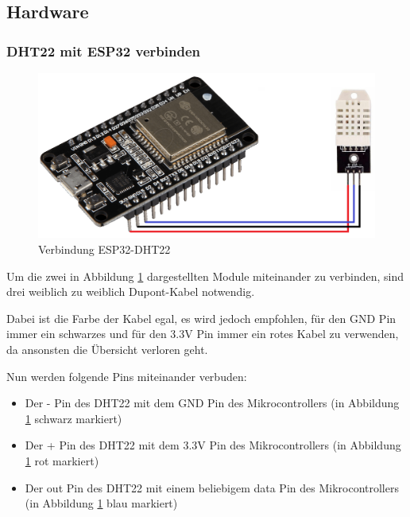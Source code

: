 \subsection{Hardware}

\subsubsection{DHT22 mit ESP32 verbinden}
\begin{figure}[H]
    \begin{center}
        \includegraphics[scale=0.36]{images/DHT22-ESP32-Connection.png}
        \caption{Verbindung ESP32-DHT22 \cite{dht22_picture, nodemcu_picture_joy-it}}
        \label{abb:esp32-dht22}
    \end{center}
\end{figure}

Um die zwei in Abbildung \ref{abb:esp32-dht22} dargestellten Module miteinander zu verbinden, sind drei weiblich zu weiblich Dupont-Kabel notwendig.

Dabei ist die Farbe der Kabel egal, es wird jedoch empfohlen, für den GND Pin immer ein schwarzes und für den 3.3V Pin immer ein rotes Kabel zu verwenden, da ansonsten die Übersicht verloren geht. 

Nun werden folgende Pins miteinander verbuden:
\begin{itemize}
    \item Der - Pin des DHT22 mit dem GND Pin des Mikrocontrollers (in Abbildung \ref{abb:esp32-dht22} schwarz markiert)
    \item Der + Pin des DHT22 mit dem 3.3V Pin des Mikrocontrollers (in Abbildung \ref{abb:esp32-dht22} rot markiert)
    \item Der out Pin des DHT22 mit einem beliebigem data Pin des Mikrocontrollers (in Abbildung \ref{abb:esp32-dht22} blau markiert)
\end{itemize}
\pagebreak

